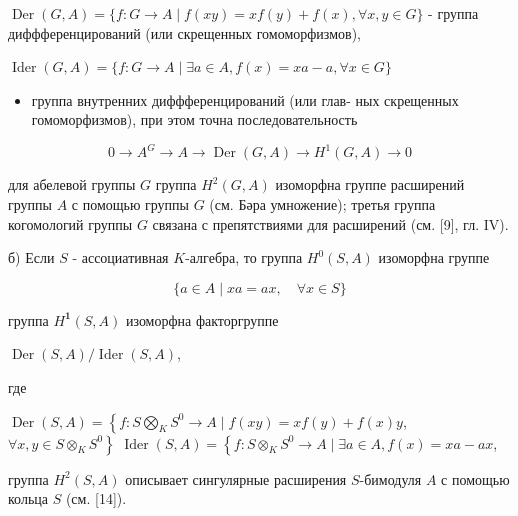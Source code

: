 \documentclass[10pt]{article}
\begin{document}
$\operatorname{Der}(G, A)=\{f: G \longrightarrow A \mid f(x y)=x f(y)+f(x), \forall x, y \in G\}$ - группа диффференцирований (или скрещенных гомоморфизмов),



$\operatorname{Ider}(G, A)=\{f: G \longrightarrow A \mid \exists a \in A, f(x)=x a-a, \forall x \in G\}$



\begin{itemize}

  \item группа внутренних диффференцирований (или глав- ных скрещенных гомоморфизмов), при этом точна последовательность

\end{itemize}



\[

0 \longrightarrow A^{G} \longrightarrow A \longrightarrow \operatorname{Der}(G, A) \rightarrow H^{1}(G, A) \rightarrow 0

\]



для абелевой группы $G$ группа $H^{2}(G, A)$ изоморфна группе расширений группы $A$ с помощью группы $G$ (см. Бәра умножение); третья группа когомологий группы $G$ связана с препятствиями для расширений (см. [9], гл. IV).



б) Если $S$ - ассоциативная $K$-алгебра, то группа $H^{0}(S, A)$ изоморфна группе



\[

\{a \in A \mid x a=a x, \quad \forall x \in S\}

\]



группа $H^{\mathbf{1}}(S, A)$ изоморфна факторгруппе



$\operatorname{Der}(S, A) / \operatorname{Ider}(S, A)$,



где



$\operatorname{Der}(S, A)=\left\{f: S \bigotimes_{K} S^{0} \longrightarrow A \mid f(x y)=x f(y)+f(x) y\right.$, $\left.\forall x, y \in S \otimes_{K} S^{0}\right\}$ $\operatorname{Ider}(S, A)=\left\{f: S \otimes_{K} S^{0} \longrightarrow A \mid \exists a \in A, f(x)=x a-a x\right.$,



группа $H^{2}(S, A)$ описывает сингулярные расширения $S$-бимодуля $A$ с помощью кольца $S$ (см. [14]).
\end{document}
